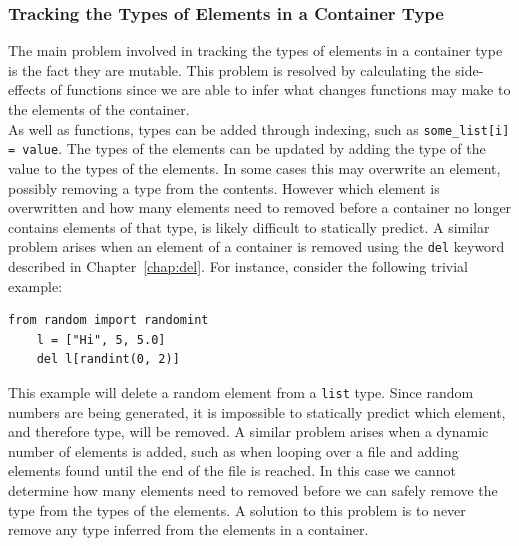 \documentclass[12pt, titlepage]{article}
\begin{document}
\subsubsection*{Tracking the Types of Elements in a Container Type}
The main problem involved in tracking the types of elements in a container type is the fact they are mutable. This problem is resolved by calculating the side-effects of functions since we are able to infer what changes functions may make to the elements of the container. \\
\indent As well as functions, types can be added through indexing, such as \texttt{some\_list[i] = value}. The types of the elements can be updated by adding the type of the value to the types of the elements. In some cases this may overwrite an element, possibly removing a type from the contents. However which element is overwritten  and how many elements need to removed before a container no longer contains elements of that type, is likely difficult to statically predict. A similar problem arises when an element of a container is removed using the \texttt{del} keyword described in Chapter~\ref{chap:del}. For instance, consider the following trivial example:
\begin{lstlisting}[mathescape]
    from random import randomint
    l = ["Hi", 5, 5.0]
    del l[randint(0, 2)]
\end{lstlisting}
This example will delete a random element from a \texttt{list} type. Since random numbers are being generated, it is impossible to statically predict which element, and therefore type, will be removed. A similar problem arises when a dynamic number of elements is added, such as when looping over a file and adding elements found until the end of the file is reached. In this case we cannot determine how many elements need to removed before we can safely remove the type from the types of the elements. A solution to this problem is to never remove any type inferred from the elements in a container.

\end{document}
